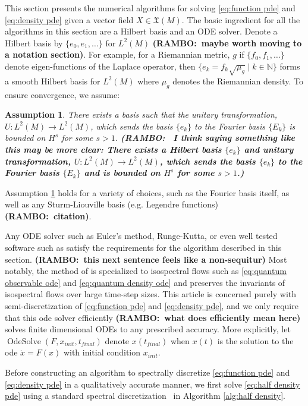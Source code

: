 \documentclass[final,leqno]{siamltex1213}
\newcommand{\ram}[1]{{\normalsize{\textbf{({\color{red}RAMBO:\ }#1)}}}}
\newtheorem{ass}[theorem]{Assumption}
\DeclareMathOperator{\OdeSolve}{OdeSolve}
\begin{document}
This section presents the numerical algorithms for solving \eqref{eq:function pde} and \eqref{eq:density pde} given a vector field $X \in \mathfrak{X}(M)$.
The basic ingredient for all the algorithms in this section are a Hilbert basis and an ODE solver.
Denote a Hilbert basis by $\{ e_{0}, e_{1},\dots \}$ for $L^{2}(M)$ \ram{maybe worth moving to a notation section}.
For example, for a Riemannian metric, $g$ if $\{ f_{0}, f_{1},\dots \}$ denote eigen-functions of the Laplace operator, then $\{ e_{k} = f_{k} \sqrt{\mu_{g}} \mid k \in \mathbb{N} \}$ forms a smooth Hilbert basis for $L^{2}(M)$ where $\mu_{g}$ denotes the Riemannian density.
To ensure convergence, we assume:
\begin{ass} \label{ass:basis}
	There exists a basis such that the unitary transformation, $U:L^{2}(M) \to L^{2}(M)$, which sends the basis $\{ e_{k} \}$ to the Fourier basis $\{E_{k} \}$ is bounded on $H^{s}$ for some $s > 1$.
	\ram{ I think saying something like this may be more clear:
	There exists a Hilbert basis $\{ e_{k} \}$ and unitary transformation, $U:L^{2}(M) \to L^{2}(M)$, which sends the basis $\{ e_{k} \}$ to the Fourier basis $\{E_{k} \}$ and is bounded on $H^{s}$ for some $s > 1$.}
\end{ass}

\noindent Assumption \ref{ass:basis} holds for a variety of choices, such as the Fourier basis itself, as well as any Sturm-Liouville basis (e.g. Legendre functions) \ram{citation}.

Any ODE solver such as Euler's method, Runge-Kutta, or even well tested software such as \cite{VODE} satisfy the requirements for the algorithm described in this section.
\ram{this next sentence feels like a non-sequitur}
Most notably, the method of \cite{Calvo1997} is specialized to isospectral flows such as  \eqref{eq:quantum observable ode} and \eqref{eq:quantum density ode} and preserves the invariants of isospectral flows over large time-step sizes.
This article is concerned purely with semi-discretization of \eqref{eq:function pde} and \eqref{eq:density pde}, and we only require that this ode solver efficiently \ram{what does efficiently mean here} solves finite dimensional ODEs to any prescribed accuracy.
More explicitly, let $\OdeSolve ( F , x_{init} , t_{final} )$ denote $x(t_{final})$ when $x(t)$ is the solution to the ode $\dot{x} = F(x)$ with initial condition $x_{init}$.

Before constructing an algorithm to spectrally discretize \eqref{eq:function pde} and \eqref{eq:density pde} in a qualitatively accurate manner, we first solve \eqref{eq:half density pde} using a standard spectral discretization~\cite{Boyd2001,NumericalRecipes} in Algorithm \ref{alg:half density}.
\end{document}
